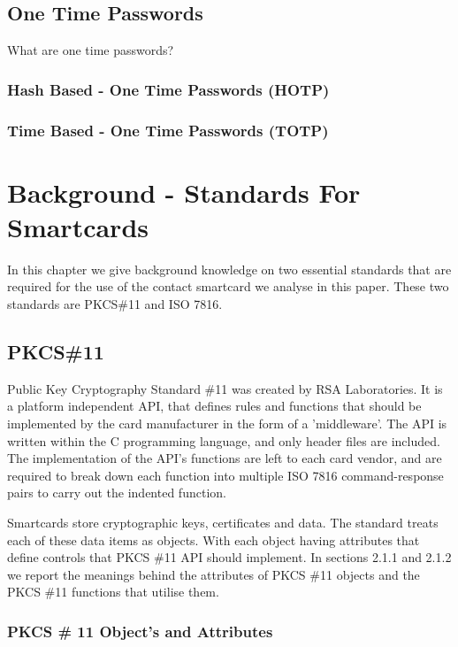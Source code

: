 \documentclass[bsc,frontabs,twoside,singlespacing,parskip,deptreport]{infthesis}     %
\begin{document}
\section{One Time Passwords}

What are one time passwords?

\subsection{Hash Based - One Time Passwords (HOTP)}
\subsection{Time Based - One Time Passwords (TOTP)}


\chapter{Background - Standards For Smartcards}

In this chapter we give background knowledge on two essential standards that are required for the use of the contact smartcard we analyse in this paper. These two standards are PKCS\#11 and ISO 7816.

\section{PKCS\#11}
Public Key Cryptography Standard \#11 was created by RSA Laboratories. It is a platform independent API, that defines rules and functions that should be implemented by the card manufacturer in the form of a 'middleware'. The API is written within the C programming language, and only header files are included. The implementation of the API's functions are left to each card vendor, and are required to break down each function into multiple ISO 7816 command-response pairs to carry out the indented function.

Smartcards store cryptographic keys, certificates and data. The standard treats each of these data items as objects. With each object having attributes that define controls that PKCS \#11 API should implement. In sections 2.1.1 and 2.1.2 we report the meanings behind the attributes of PKCS \#11 objects and the PKCS \#11 functions that utilise them.

\pagebreak
\subsection{PKCS \# 11 Object's and Attributes}
\end{document}
